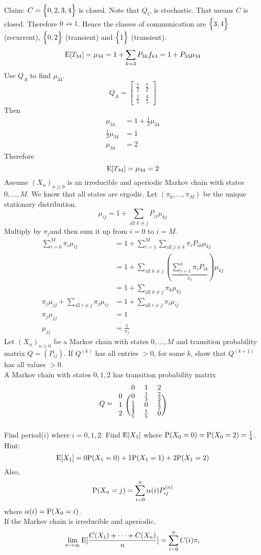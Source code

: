 \documentclass[12pt]{article}
\begin{document}
Claim: $C=\Big\{ 0,2,3,4 \Big\}$ is closed. Note that $Q_C$ is stochastic. That means $C$ is closed. Therefore $0 \not\to 1$. Hence the classes of communication are $\Big\{ 3,4 \Big\}$ (recurrent), $\Big\{ 0,2 \Big\}$ (transient) and $\Big\{ 1 \Big\}$ (transient). $$\mathrm{E}[ T_{34} ] = \mu_{34} = 1 + \sum_{k=3} P_{3k}f_{k4} = 1 + P_{33}\mu_{34} $$ Use $Q_A$ to find $\mu_{34}$. $$ Q_A = \begin{bmatrix} \frac{1}{2} & \frac{1}{2} \\ \frac{1}{5} & \frac{4}{5} \end{bmatrix} $$ Then $$ \begin{aligned} \mu_{34} &= 1 + \frac{1}{2}\mu_{34} \\ \frac{1}{2}\mu_{34} &= 1 \\ \mu_{34} &= 2 \end{aligned} $$ Therefore $$ \mathrm{E}[ T_{34} ] = \mu_{34} = 2 $$ 
Assume $(X_n)_{n\geq0}$ is an irreducible and aperiodic Markov chain with states $0,\dots,M$. We know that all states are ergodic. Let $(\pi_0,\dots,\pi_M)$ be the unique stationary distribution. $$ \mu_{ij} = 1 + \sum_{\text{all } k \neq j} P_{ij}\mu_{kj} $$ Multiply by $\pi_j$and then sum it up from $i=0$ to $i=M$. $$ \begin{aligned} \sum_{i=0}^M \pi_i \mu_{ij} &= 1 + \sum_{i=1}^M \sum_{\text{all } j \neq k} \pi_i P_{ik}\mu_{kj} \\ &= 1 + \sum_{\text{all } k \neq j} (\underbrace{\sum_{i=1}^n \pi_i P_{ik}}_{\pi_k})\mu_{kj} \\ &= 1 + \sum_{\text{all } k \neq j} \pi_k\mu_{kj} \\ \pi_j\mu_{jj} + \sum_{\text{all } i \neq j} \pi_j\mu_{ij} &= 1 + \sum_{\text{all } i \neq j} \pi_i\mu_{ij} \\ \pi_j\mu_{jj} &= 1 \\ \mu_{jj} &= \frac{1}{\pi_j} \end{aligned} $$ 
Let $(X_n)_{n\geq0}$ be a Markov chain with states $0,\dots,M$ and transition probability matrix $Q = (P_{ij})$. If $Q^{(k)}$ has all entries $> 0$, for some $k$, show that $Q^{(k+1)}$ has all values $>0$. \\
A Markov chain with states $0,1,2$ has transition probability matrix $$Q = \begin{blockarray}{cccc}
&0&1&2 \\
\begin{block}{c(ccc)}
0 & 0 & \frac{1}{3} & \frac{2}{3} \\
1 & \frac{1}{2} & 0 & \frac{1}{2}  \\ 
2 & \frac{4}{5} & \frac{1}{5} & 0  \\ \end{block} \end{blockarray} $$
Find period($i$) where $i = 0,1,2$. Find $\mathrm{E}[ X_1 ]$ where $\mathrm{P}( X_0=0 ) = \mathrm{P}( X_0=2 ) = \frac{1}{4}$. Hint: $$ \mathrm{E}[ X_1 ] = 0\mathrm{P}( X_1=0 ) + 1\mathrm{P}( X_1=1 ) + 2\mathrm{P}( X_1=2 ) $$ 
Also, $$ \mathrm{P}( X_n = j ) = \sum_{i=0}^n \alpha(i)P_{ij}^{(n)} $$ where $\alpha(i) = \mathrm{P}( X_0=i )$. \\
If the Markov chain is irreducible and aperiodic, $$ \lim_{n\to\infty} \mathrm{E}[  \frac{C(X_1) + \dots + C(X_n)}{n} ] = \sum_{i=0}^n C(i)\pi_i $$ 
\end{document}
